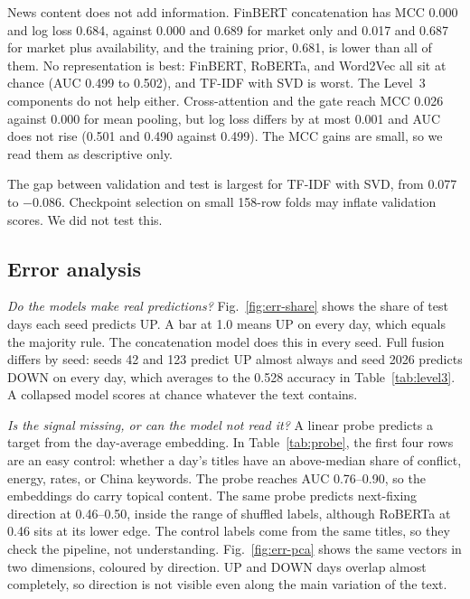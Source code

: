 News content does not add information. FinBERT concatenation has MCC 0.000 and log loss 0.684, against 0.000 and 0.689 for market only and 0.017 and 0.687 for market plus availability, and the training prior, 0.681, is lower than all of them. No representation is best: FinBERT, RoBERTa, and Word2Vec all sit at chance (AUC 0.499 to 0.502), and TF-IDF with SVD is worst. The Level~3 components do not help either. Cross-attention and the gate reach MCC 0.026 against 0.000 for mean pooling, but log loss differs by at most 0.001 and AUC does not rise (0.501 and 0.490 against 0.499). The MCC gains are small, so we read them as descriptive only.

The gap between validation and test is largest for TF-IDF with SVD, from 0.077 to $-$0.086. Checkpoint selection on small 158-row folds may inflate validation scores. We did not test this.

\subsection{Error analysis}
\emph{Do the models make real predictions?} Fig.~\ref{fig:err-share} shows the share of test days each seed predicts UP. A bar at 1.0 means UP on every day, which equals the majority rule. The concatenation model does this in every seed. Full fusion differs by seed: seeds 42 and 123 predict UP almost always and seed 2026 predicts DOWN on every day, which averages to the 0.528 accuracy in Table~\ref{tab:level3}. A collapsed model scores at chance whatever the text contains.



\emph{Is the signal missing, or can the model not read it?} A linear probe predicts a target from the day-average embedding. In Table~\ref{tab:probe}, the first four rows are an easy control: whether a day's titles have an above-median share of conflict, energy, rates, or China keywords. The probe reaches AUC 0.76--0.90, so the embeddings do carry topical content. The same probe predicts next-fixing direction at 0.46--0.50, inside the range of shuffled labels, although RoBERTa at 0.46 sits at its lower edge. The control labels come from the same titles, so they check the pipeline, not understanding. Fig.~\ref{fig:err-pca} shows the same vectors in two dimensions, coloured by direction. UP and DOWN days overlap almost completely, so direction is not visible even along the main variation of the text.




